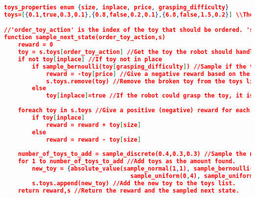 \DeclareCaptionFormat{}{\hrule}
\begin{lstlisting}[floatplacement=h,numbersymbol=$:$,language=json,caption={The Room Cleaning domain in pseudo PPL code.},label={lst:openWorld_PPL},basicstyle=\tiny]
toys_properties enum {size, inplace, price, grasping_difficulty}
toys=[{0.1,true,0.3,0.1},{0.8,false,0.2,0.1},{6.8,false,1.5,0.2}] \\The 'toys' list is the only state variable.

//'order_toy_action' is the index of the toy that should be ordered. 's' is the state we want to sample (the next state and reward) from. 
function sample_next_state(order_toy_action,s) 
    reward = 0
    toy = s.toys[order_toy_action] //Get the toy the robot should handle.
    if not toy[inplace] //If toy not in place
        if sample_bernoulli(toy[grasping_difficulty]) //Sample if the toy falls and breaks based on its grasping difficulty.
            reward = -toy[price] //Give a negative reward based on the toy price.
            s.toys.remove(toy) //Remove the broken toy from the toys list.
        else
            toy[inplace]=true //If the robot could grasp the toy, it is said to be in place.
 
    foreach toy in s.toys //Give a positive (negative) reward for each toy (not) in place by its size.
        if toy[inplace]
            reward = reward + toy[size]
        else
            reward = reward - toy[size]
            
    number_of_toys_to_add = sample_discrete(0.4,0.3,0.3) //Sample the number of new toys found (zero:0.4, one:0.3, or two:0.3). 
    for 1 to number_of_toys_to_add //Add toys as the amount found.
        new_toy = {absolute_value(sample_normal(1,1), sample_bernoulli(0.2),
                                    sample_uniform(0,4), sample_uniform(0,0.4)} //Sample the new toy properties.
        s.toys.append(new_toy) //Add the new toy to the toys list.
    return reward,s //Return the reward and the sampled next state.
\end{lstlisting} 